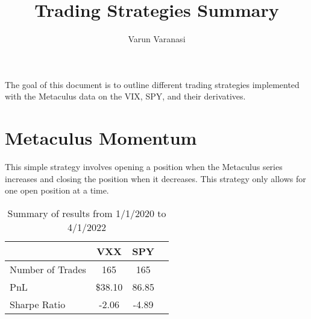 \documentclass{article}
\title{Trading Strategies Summary}
\author{Varun Varanasi}
\begin{document}
\maketitle

The goal of this document is to outline different trading strategies implemented with the Metaculus data on the VIX, SPY, and their derivatives.

\section*{Metaculus Momentum}
This simple strategy involves opening a position when the Metaculus series increases and closing the position when it decreases. This strategy only allows for one open position at a time.

\begin{table}[h]
\centering

\begin{tabular}{l||ccc}
    \toprule
     & \textbf{VXX} & \textbf{SPY} & \\
    \midrule
    Number of Trades & 165  & 165\\
    PnL & \$38.10 & 86.85 \\
    Sharpe Ratio & -2.06 & -4.89\\
    \bottomrule
\end{tabular}
\caption{Summary of results from 1/1/2020 to 4/1/2022}
\end{table}
\end{document}
